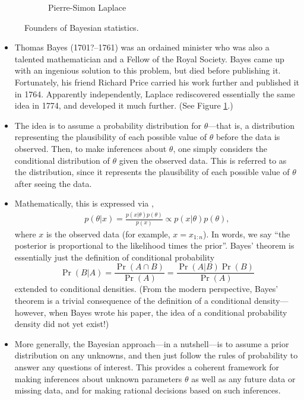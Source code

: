 \documentclass[12pt]{article}
\begin{document}
\begin{figure}
\begin{subfigure}[t]{0.33\textwidth}
        \caption*{Pierre-Simon Laplace}
    \end{subfigure}
    \caption{Founders of Bayesian statistics.}
    \label{figure:founders}
\end{figure}

\begin{itemize}
    \item Thomas Bayes (1701?--1761) was an ordained minister who was also a talented mathematician and a Fellow of the Royal Society.  Bayes came up with an ingenious solution to this problem, but died before publishing it. Fortunately, his friend Richard Price carried his work further and published it in 1764. Apparently independently, Laplace rediscovered essentially the same idea in 1774, and developed it much further. (See Figure \ref{figure:founders}.)
\item The idea is to assume a  probability distribution for $\theta$---that is, a distribution representing the plausibility of each possible value of $\theta$ before the data is observed. Then, to make inferences about $\theta$, one simply considers the conditional distribution of $\theta$ given the observed data. This is referred to as the  distribution, since it represents the plausibility of each possible value of $\theta$ after seeing the data.
\item Mathematically, this is expressed via ,
\begin{align}\label{equation:Bayes}
p(\theta|x) =\frac{p(x|\theta) p(\theta)}{p(x)}\propto p(x|\theta) p(\theta),
\end{align}
where $x$ is the observed data (for example, $x = x_{1:n}$). In words, we say ``the posterior is proportional to the likelihood times the prior''. Bayes' theorem is essentially just the definition of conditional probability
$$\Pr(B|A) =\frac{\Pr(A\cap B)}{\Pr(A)} =\frac{\Pr(A|B)\Pr(B)}{\Pr(A)} $$
extended to conditional densities. (From the modern perspective, Bayes' theorem is a trivial consequence of the definition of a conditional density---however, when Bayes wrote his paper, the idea of a conditional probability density did not yet exist!)
\item More generally, the Bayesian approach---in a nutshell---is to assume a prior distribution on any unknowns, and then just follow the rules of probability to answer any questions of interest. This provides a coherent framework for making inferences about unknown parameters $\theta$ as well as any future data or missing data, and for making rational decisions based on such inferences. 
\end{itemize}
\end{document}
